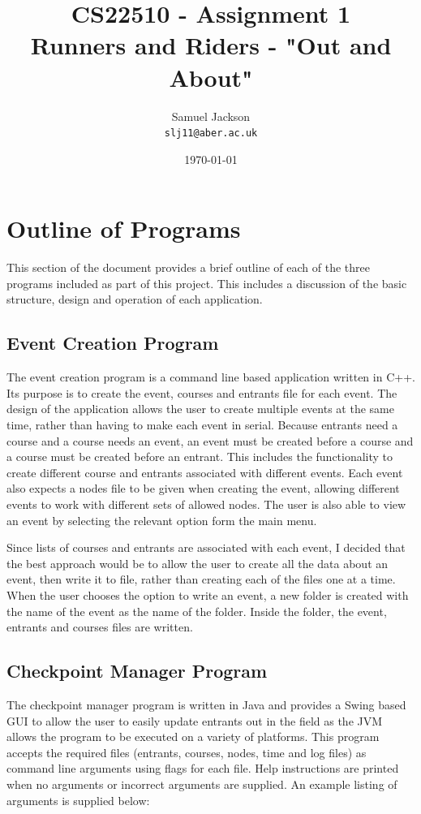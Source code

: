 \documentclass{article}
\begin{document}
\title{CS22510 - Assignment 1 \\ Runners and Riders - "Out and About"}
\author{Samuel Jackson \\ \texttt{slj11@aber.ac.uk}}
\date{\today}
\maketitle

\section{Outline of Programs}
This section of the document provides a brief outline of each of the three programs included as part of this project. This includes a discussion of the basic structure, design and operation of each application.

\subsection{Event Creation Program}
The event creation program is a command line based application written in C++. Its purpose is to create the event, courses and entrants file for each event. The design of the application allows the user to create multiple events at the same time, rather than having to make each event in serial. Because entrants need a course and a course needs an event, an event must be created before a course and a course must be created before an entrant. This includes the functionality to create different course and entrants associated with different events. Each event also expects a nodes file to be given when creating the event, allowing different events to work with different sets of allowed nodes. The user is also able to view an event by selecting the relevant option form the main menu.

Since lists of courses and entrants are associated with each event, I decided that the best approach would be to allow the user to create all the data about an event, then write it to file, rather than creating each of the files one at a time. When the user chooses the option to write an event, a new folder is created with the name of the event as the name of the folder. Inside the folder, the event, entrants and courses files are written.

\subsection{Checkpoint Manager Program}
The checkpoint manager program is written in Java and provides a Swing based GUI to allow the user to easily update entrants out in the field as the JVM allows the program to be executed on a variety of platforms. This program accepts the required files (entrants, courses, nodes, time and log files) as command line arguments using flags for each file. Help instructions are printed when no arguments or incorrect arguments are supplied. An example listing of arguments is supplied below:
\end{document}
